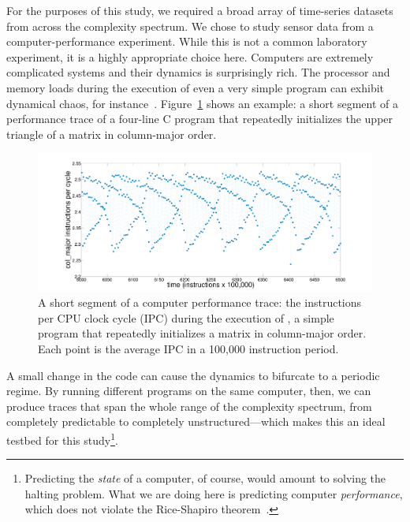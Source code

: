 For the purposes of this study, we required a broad array of
time-series datasets from across the complexity spectrum.  We chose to
study sensor data from a computer-performance experiment.  While this
is not a common laboratory experiment, it is a highly appropriate
choice here.  Computers are extremely complicated systems and their
dynamics is surprisingly rich.
The processor and memory loads during the execution of even a very
simple program can exhibit dynamical chaos, for
instance~\cite{mytkowicz09}.  Figure~\ref{fig:col-ipc} shows an
example: a short segment of a performance trace of a four-line C
program that repeatedly initializes the upper triangle of a matrix in
column-major order.
%
 \begin{figure}[htp]
    \centering
    \includegraphics[width=\columnwidth]{figs/colshortts}
    \caption{A short segment of a computer performance trace: the
      instructions per CPU clock cycle (IPC) during the execution of
      \col, a simple program that repeatedly initializes a matrix in
      column-major order.  Each point is the average IPC in a 100,000
      instruction period.}
   \label{fig:col-ipc}
  \end{figure}
%
A small change in the code can cause the dynamics to bifurcate to a
periodic regime.  
% 
By running different programs on the same computer, then, we can
produce traces that span the whole range of the complexity spectrum,
from completely predictable to completely unstructured---which makes
this an ideal testbed for this study\footnote{Predicting the
  \emph{state} of a computer, of course, would amount to solving the
  halting problem.  What we are doing here is predicting computer
  \emph{performance}, which does not violate the Rice-Shapiro
  theorem~\cite{hopcroft2007}.}.

